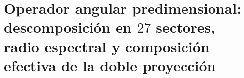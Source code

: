 \chapter{Operador angular predimensional: descomposición en \(27\) sectores, radio espectral y composición efectiva de la doble proyección}
\label{chap:p3-final:37:operador_angular}

